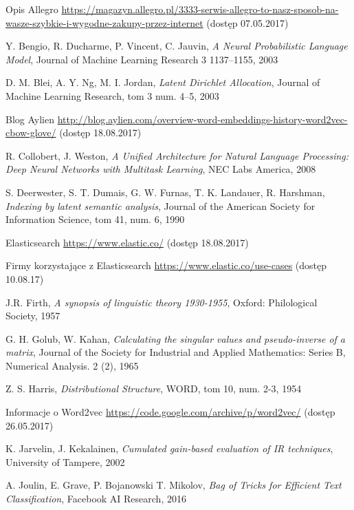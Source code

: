 \documentclass[pl]{minipw} %
\begin{document}
\begin{thebibliography}{30}
		Opis Allegro
		\url{https://magazyn.allegro.pl/3333-serwis-allegro-to-nasz-sposob-na-wasze-szybkie-i-wygodne-zakupy-przez-internet}
		(dostęp 07.05.2017)
	
		Y. Bengio, R. Ducharme, P. Vincent, C. Jauvin,
		\emph{A Neural Probabilistic Language Model},
		Journal of Machine Learning Research 3 1137–1155,
		2003
	
		D. M. Blei, A. Y. Ng, M. I. Jordan,
		\emph{Latent Dirichlet Allocation},
		Journal of Machine Learning Research, tom 3 num. 4–5,
		2003
		
		Blog Aylien
		\url{http://blog.aylien.com/overview-word-embeddings-history-word2vec-cbow-glove/}
		(dostęp 18.08.2017)
	
		R. Collobert, J. Weston,
		\emph{A Unified Architecture for Natural Language Processing: Deep Neural Networks with Multitask Learning},
		NEC Labs America,
		2008
	
		S. Deerwester, S. T. Dumais, G. W. Furnas, T. K. Landauer, R. Harshman,
		\emph{Indexing by latent semantic analysis},
		Journal of the American Society for Information Science, tom 41, num. 6,
		1990
	
		Elasticsearch
		\url{https://www.elastic.co/}
		(dostęp 18.08.2017)
	
		Firmy korzystające z Elasticsearch
		\url{https://www.elastic.co/use-cases}
		(dostęp 10.08.17)
	
		J.R. Firth,
		\emph{A synopsis of linguistic theory 1930-1955},
		Oxford: Philological Society,
		1957
	
		G. H. Golub, W. Kahan,
		\emph{Calculating the singular values and pseudo-inverse of a matrix},
		Journal of the Society for Industrial and Applied Mathematics: Series B, Numerical Analysis. 2 (2),
		1965
	
		Z. S. Harris,
		\emph{Distributional Structure},
		WORD, tom 10, num. 2-3,
		1954
	
		Informacje o Word2vec
		\url{https://code.google.com/archive/p/word2vec/}
		(dostęp 26.05.2017)
	
		K. Jarvelin, J. Kekalainen,
		\emph{Cumulated gain-based evaluation of IR techniques},
		University of Tampere,
		2002
	
		A. Joulin, E. Grave, P. Bojanowski T. Mikolov,
		\emph{Bag of Tricks for Efficient Text Classification},
		Facebook AI Research,
		2016
	

\end{thebibliography}
\end{document}
